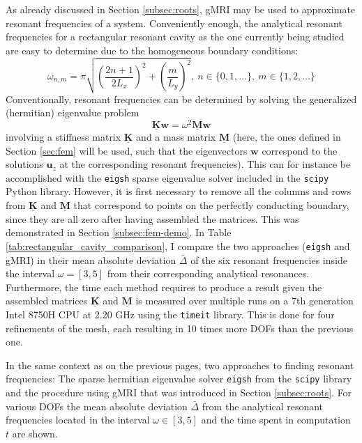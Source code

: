 \documentclass[11pt, a4paper]{article}
\begin{document}
As already discussed in Section \ref{subsec:roots}, \acrshort{gMRI} may be used
to approximate resonant frequencies of a system. Conveniently enough, the analytical
resonant frequencies for a rectangular resonant cavity as the one currently being 
studied are easy to determine due to the homogeneous boundary conditions:
\begin{equation}
    \omega_{n, m} = \pi \sqrt{\left(\frac{2n + 1}{2L_x}\right)^2 + \left(\frac{m}{L_y}\right)^2},
    ~n \in \{0, 1, \dots\}, ~m \in \{1, 2, \dots \} \label{equ:analytical-eigenmodes}
\end{equation}
Conventionally, resonant frequencies can be determined by solving the generalized
(hermitian) eigenvalue problem
\begin{equation}
    \mathbf{\underline{K}} \mathbf{w} = \omega^2 \mathbf{\underline{M}} \mathbf{w}
    \label{equ:numerical-eigenmodes}
\end{equation}
involving a stiffness matrix $\mathbf{\underline{K}}$ and a mass matrix $\mathbf{\underline{M}}$
(here, the ones defined in Section \ref{sec:fem} will be used, such that the
eigenvectors $\mathbf{w}$ correspond to the solutions $\mathbf{u}_z$ at the
corresponding resonant frequencies).
This can for instance be accomplished with the \texttt{eigsh} sparse eigenvalue
solver included in the \texttt{scipy} Python library. However, it is first necessary
to remove all the columns and rows from $\mathbf{\underline{K}}$ and $\mathbf{\underline{M}}$
that correspond to points on the perfectly conducting boundary, since they are
all zero after having assembled the matrices. This was demonstrated in Section
\ref{subsec:fem-demo}. In Table \ref{tab:rectangular_cavity_comparison}, I compare
the two approaches (\texttt{eigsh} and \acrshort{gMRI}) in their mean absolute deviation
$\bar{\Delta}$ of the six resonant frequencies inside the interval $\omega = [3, 5]$ 
from their corresponding analytical resonances. Furthermore, the time each method
requires to produce a result given the assembled matrices $\mathbf{\underline{K}}$
and $\mathbf{\underline{M}}$ is measured over multiple runs on a 7th generation
Intel 8750H CPU at 2.20 GHz using the \texttt{timeit} library. This is done
for four refinements of the mesh, each resulting in 10 times more \acrshort{DOF}s
than the previous one.

\begin{table}[ht]
    \caption{In the same context as on the previous pages, two approaches to
    finding resonant frequencies: The sparse hermitian eigenvalue solver
    \texttt{eigsh} from the \texttt{scipy} library and the procedure using
    \acrshort{gMRI} that was introduced in Section \ref{subsec:roots}. For
    various \acrshort{DOF}s the mean absolute deviation $\bar{\Delta}$ from the analytical
    resonant frequencies located in the interval $\omega \in [3, 5]$ and the time spent in computation $t$ are shown.}
    \label{tab:rectangular_cavity_comparison}
    
\end{table}
\end{document}
